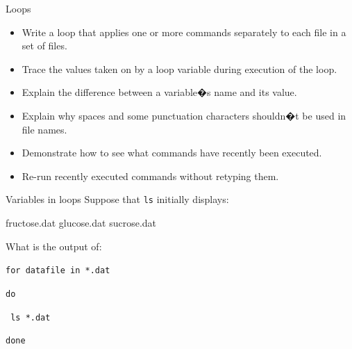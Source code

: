 \documentclass{beamer}
\begin{document}
\begin{frame}{Loops}
\begin{itemize}
    \item{Write a loop that applies one or more commands separately to each file in a set of files.}
    \item{Trace the values taken on by a loop variable during execution of the loop.}
    \item{Explain the difference between a variable�s name and its value.}
    \item{Explain why spaces and some punctuation characters shouldn�t be used in file names.}
    \item{Demonstrate how to see what commands have recently been executed.}
    \item{Re-run recently executed commands without retyping them.}
    \end{itemize}
\end{frame}



\begin{frame}{Variables in loops}
Suppose that \texttt{ls} initially displays:
\vspace{0.7cm}
\begin{beamerboxesrounded}[upper=uppercolgreen,lower=lowercolgreen,shadow=false]{}
fructose.dat      glucose.dat       sucrose.dat
\end{beamerboxesrounded}

What is the output of:
\vspace{0.7cm}
\begin{beamerboxesrounded}[upper=uppercolgreen,lower=lowercolgreen,shadow=false]{}
\texttt{for datafile in *.dat}

\texttt{do}

\texttt{	ls *.dat}

\texttt{done}
\end{beamerboxesrounded}

\end{frame}

\end{document}
